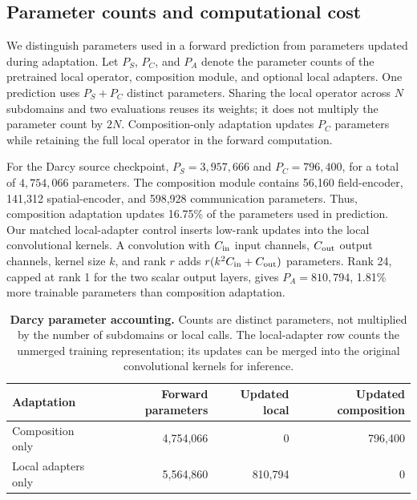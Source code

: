 \subsection{Parameter counts and computational cost}
\label{app:adaptation-compute}

We distinguish parameters used in a forward prediction from parameters updated
during adaptation. Let $P_S$, $P_C$, and $P_A$ denote the parameter counts of
the pretrained local operator, composition module, and optional local
adapters. One \lddm{} prediction uses $P_S+P_C$ distinct parameters. Sharing
the local operator across $N$ subdomains and two evaluations reuses its
weights; it does not multiply the parameter count by $2N$. Composition-only
adaptation updates $P_C$ parameters while retaining the full local operator
in the forward computation.

For the Darcy source checkpoint, $P_S=3{,}957{,}666$ and
$P_C=796{,}400$, for a total of $4{,}754{,}066$ parameters. The composition
module contains 56,160 field-encoder, 141,312 spatial-encoder, and 598,928
communication parameters. Thus, composition adaptation updates 16.75\% of
the parameters used in prediction. Our matched local-adapter control inserts
low-rank updates into the local convolutional kernels. A convolution with
$C_{\rm in}$ input channels, $C_{\rm out}$ output channels, kernel size $k$,
and rank $r$ adds $r(k^2 C_{\rm in}+C_{\rm out})$ parameters. Rank 24,
capped at rank 1 for the two scalar output layers, gives $P_A=810{,}794$,
1.81\% more trainable parameters than composition adaptation.

\begin{table}[ht]
\centering
\small
\caption{\textbf{Darcy parameter accounting.} Counts are distinct parameters,
not multiplied by the number of subdomains or local calls. The local-adapter
row counts the unmerged training representation; its updates can be merged
into the original convolutional kernels for inference.}
\label{tab:darcy-parameter-accounting}
\begin{tabular}{@{}lrrr@{}}
\toprule
Adaptation & Forward parameters & Updated local & Updated composition \\
\midrule
Composition only & 4,754,066 & 0 & 796,400 \\
Local adapters only & 5,564,860 & 810,794 & 0 \\
\bottomrule
\end{tabular}
\end{table}

